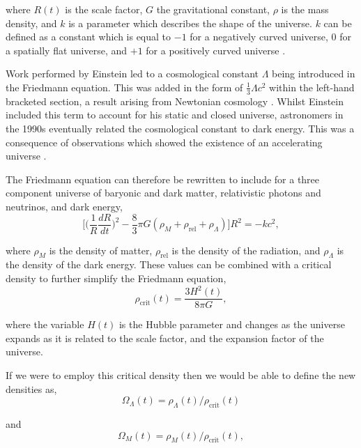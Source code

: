 \documentclass[twocolumn]{revtex4}
\begin{document}
where $R(t)$ is the scale factor, $G$ the gravitational constant, $\rho$ is the mass density, and $k$ is a parameter which describes the shape of the universe. $k$ can be defined as a constant which is equal to $-1$ for a negatively curved universe, $0$ for a spatially flat universe, and $+1$ for a positively curved universe \cite{mod_ast, longair}. 

Work performed by Einstein led to a cosmological constant $\Lambda$ being introduced in the Friedmann equation. This was added in the form of $\tfrac{1}{3}\Lambda c^2$ within the left-hand bracketed section, a result arising from Newtonian cosmology \cite{mod_ast}. Whilst Einstein included this term to account for his static and closed universe, astronomers in the 1990s eventually related the cosmological constant to dark energy. This was a consequence of observations which showed the existence of an accelerating universe \cite{mod_ast}. 

The Friedmann equation can therefore be rewritten to include for a three component universe of baryonic and dark matter, relativistic photons and neutrinos, and dark energy, 
\begin{equation}
\Big[ \Big( \frac{1}{R} \frac{dR}{dt} \Big)^2 - \frac{8}{3} \pi G (\rho_{M} + \rho_{\text{rel}} + \rho_{\Lambda} )\Big] R^2 = -kc^2,
\end{equation}

where $\rho_{M}$ is the density of matter, $\rho_{\text{rel}}$ is the density of the radiation, and $\rho_{\Lambda}$ is the density of the dark energy. These values can be combined with a critical density to further simplify the Friedmann equation,
\begin{equation}
\rho_{\text{crit}} (t) = \frac{3 H^2(t)}{8 \pi G},
\end{equation}

where the variable $H(t)$ is the Hubble parameter and changes as the universe expands as it is related to the scale factor, and the expansion factor of the universe. 

If we were to employ this critical density then we would be able to define the new densities as,
\begin{equation}
\Omega_{\Lambda}(t) = \rho_{\Lambda}(t) / \rho_{\text{crit}}(t)
\label{eqn:omg_lam}
\end{equation}

and 
\begin{equation}
\Omega_{M}(t) = \rho_{M}(t) / \rho_{\text{crit}}(t),
\label{eqn:omg_m}
\end{equation}
\end{document}

